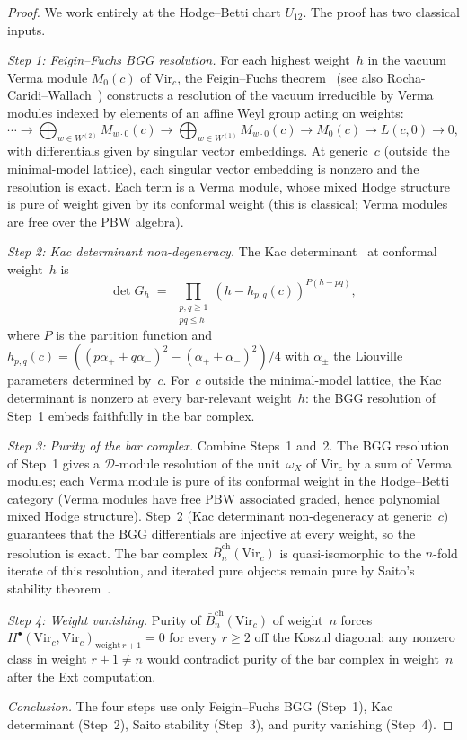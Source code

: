 \documentclass[11pt,reqno]{amsart}
\theoremstyle{definition}
\theoremstyle{remark}
\newcommand{\cD}{\mathcal{D}}
\newcommand{\barBch}{\bar{B}^{\mathrm{ch}}}
\newcommand{\Vir}{\mathrm{Vir}}
\numberwithin{equation}{section}
\begin{document}
\begin{proof}
We work entirely at the Hodge--Betti chart $U_{12}$. The proof
has two classical inputs.

\emph{Step 1: Feigin--Fuchs BGG resolution.}
For each highest weight~$h$ in the vacuum Verma module
$M_0(c)$ of $\Vir_c$, the Feigin--Fuchs theorem~\cite{FeiginFuchs90}
(see also Rocha-Caridi--Wallach~\cite{RCW82}) constructs a
resolution of the vacuum irreducible by Verma modules indexed by
elements of an affine Weyl group acting on weights:
\[
\cdots \to
\bigoplus_{w \in W^{(2)}} M_{w \cdot 0}(c) \to
\bigoplus_{w \in W^{(1)}} M_{w \cdot 0}(c) \to
M_0(c) \to L(c,0) \to 0,
\]
with differentials given by singular vector embeddings. At
generic~$c$ (outside the minimal-model lattice), each singular
vector embedding is nonzero and the resolution is exact. Each
term is a Verma module, whose mixed Hodge structure is pure of
weight given by its conformal weight (this is classical; Verma
modules are free over the PBW algebra).

\emph{Step 2: Kac determinant non-degeneracy.}
The Kac determinant~\cite{KacBook,FeiginFuchs90} at conformal
weight~$h$ is
\[
\det G_h
\;=\; \prod_{\substack{p, q \geq 1 \\ pq \leq h}}
(h - h_{p,q}(c))^{P(h - pq)},
\]
where $P$ is the partition function and
$h_{p,q}(c) = ((p\alpha_+ + q\alpha_-)^2 - (\alpha_+ + \alpha_-)^2)/4$
with $\alpha_\pm$ the Liouville parameters determined by~$c$.
For~$c$ outside the minimal-model lattice, the Kac determinant is
nonzero at every bar-relevant weight~$h$: the BGG resolution of
Step~1 embeds faithfully in the bar complex.

\emph{Step 3: Purity of the bar complex.}
Combine Steps~1 and~2. The BGG resolution of Step~1 gives a
$\cD$-module resolution of the unit~$\omega_X$ of $\Vir_c$ by a
sum of Verma modules; each Verma module is pure of its conformal
weight in the Hodge--Betti category (Verma modules have free PBW
associated graded, hence polynomial mixed Hodge structure). Step~2
(Kac determinant non-degeneracy at generic~$c$) guarantees that
the BGG differentials are injective at every weight, so the
resolution is exact. The bar complex $\barBch_n(\Vir_c)$ is
quasi-isomorphic to the $n$-fold iterate of this resolution,
and iterated pure objects remain pure by Saito's stability
theorem~\cite{Saito}.

\emph{Step 4: Weight vanishing.}
Purity of $\barBch_n(\Vir_c)$ of weight~$n$ forces
$H^\bullet(\Vir_c,\Vir_c)_{\mathrm{weight}\,r+1} = 0$ for every
$r \geq 2$ off the Koszul diagonal: any nonzero class in weight
$r + 1 \neq n$ would contradict purity of the bar complex in
weight~$n$ after the Ext computation.

\emph{Conclusion.} The four steps use only Feigin--Fuchs BGG
(Step~1), Kac determinant (Step~2), Saito stability (Step~3),
and purity vanishing (Step~4).
\end{proof}
\end{document}
